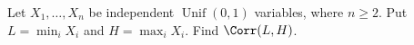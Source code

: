 Let $X_1,\ldots,X_n$ be independent $\operatorname{Unif}(0,1)$ variables, where $n\ge2$. Put $L=\min_iX_i$ and $H=\max_iX_i$. Find $\Corr(L,H)$.
